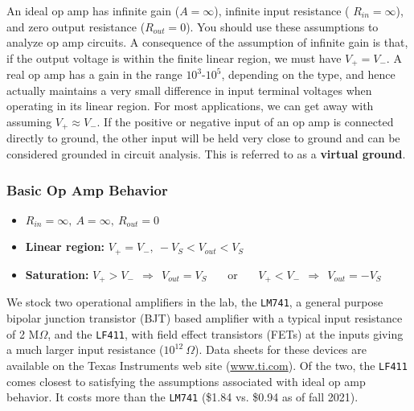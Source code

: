 \documentclass[11pt]{article}
\begin{document}
An ideal op amp has infinite gain ($A = \infty$), infinite input
resistance ( $R_{in} = \infty$), and zero output resistance
($R_{out} = 0$). You should use these assumptions to analyze op amp
circuits. A consequence of the assumption of infinite gain is that, if
the output voltage is within the finite linear region, we must have
$V_+ = V_-$. A real op amp has a gain in the range $10^3$-$10^5$,
depending on the type, and hence actually maintains a very small
difference in input terminal voltages when operating in its linear
region. For most applications, we can get away with assuming
$V_+ \approx V_-$. If the positive or negative input of an op amp is
connected directly to ground, the other input will be held very close
to ground and can be considered grounded in circuit analysis. This is
referred to as a \textbf{virtual ground}.

\htmlrule
\begin{latexonly}
  \noindent
  \hrulefill
\end{latexonly}
\subsubsection*{Basic Op Amp Behavior}
\begin{itemize}
\item $R_{in} = \infty,~A = \infty,~R_{out} = 0$
\item \textbf{Linear region:} $V_+ = V_-,~-V_S < V_{out} < V_S$
\item \textbf{Saturation:} $V_+ > V_-~~\Longrightarrow~~V_{out} = V_S$
  ~~~or~~~ $V_+ < V_-~~\Longrightarrow~~V_{out} = -V_S$
\end{itemize}
\htmlrule
\begin{latexonly}
  \noindent
  \hrulefill
\end{latexonly}

We stock two operational amplifiers in the lab, the \texttt{LM741}, a
general purpose bipolar junction transistor (BJT) based amplifier with
a typical input resistance of 2 M$\Omega $, and the \texttt{LF411},
with field effect transistors (FETs) at the inputs giving a much
larger input resistance ($10^{12}~\Omega$). Data sheets for these
devices are available on the Texas Instruments web site
(\url{www.ti.com}). Of the two, the \texttt{LF411} comes closest to
satisfying the assumptions associated with ideal op amp behavior. It
costs more than the \texttt{LM741} (\$1.84 vs. \$0.94 as of fall
2021).
\end{document}
